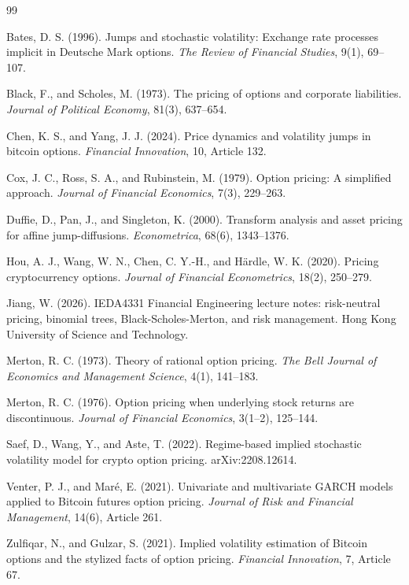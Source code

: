 \documentclass[11pt]{article}
\begin{document}
\newpage
\begin{thebibliography}{99}

Bates, D. S. (1996).
Jumps and stochastic volatility: Exchange rate processes implicit in Deutsche Mark options.
\emph{The Review of Financial Studies}, 9(1), 69--107.

Black, F., and Scholes, M. (1973).
The pricing of options and corporate liabilities.
\emph{Journal of Political Economy}, 81(3), 637--654.

Chen, K. S., and Yang, J. J. (2024).
Price dynamics and volatility jumps in bitcoin options.
\emph{Financial Innovation}, 10, Article 132.

Cox, J. C., Ross, S. A., and Rubinstein, M. (1979).
Option pricing: A simplified approach.
\emph{Journal of Financial Economics}, 7(3), 229--263.

Duffie, D., Pan, J., and Singleton, K. (2000).
Transform analysis and asset pricing for affine jump-diffusions.
\emph{Econometrica}, 68(6), 1343--1376.

Hou, A. J., Wang, W. N., Chen, C. Y.-H., and H\"ardle, W. K. (2020).
Pricing cryptocurrency options.
\emph{Journal of Financial Econometrics}, 18(2), 250--279.

Jiang, W. (2026).
IEDA4331 Financial Engineering lecture notes: risk-neutral pricing, binomial trees, Black-Scholes-Merton, and risk management.
Hong Kong University of Science and Technology.

Merton, R. C. (1973).
Theory of rational option pricing.
\emph{The Bell Journal of Economics and Management Science}, 4(1), 141--183.

Merton, R. C. (1976).
Option pricing when underlying stock returns are discontinuous.
\emph{Journal of Financial Economics}, 3(1--2), 125--144.

Saef, D., Wang, Y., and Aste, T. (2022).
Regime-based implied stochastic volatility model for crypto option pricing.
arXiv:2208.12614.

Venter, P. J., and Mar\'e, E. (2021).
Univariate and multivariate GARCH models applied to Bitcoin futures option pricing.
\emph{Journal of Risk and Financial Management}, 14(6), Article 261.

Zulfiqar, N., and Gulzar, S. (2021).
Implied volatility estimation of Bitcoin options and the stylized facts of option pricing.
\emph{Financial Innovation}, 7, Article 67.

\end{thebibliography}
\end{document}
